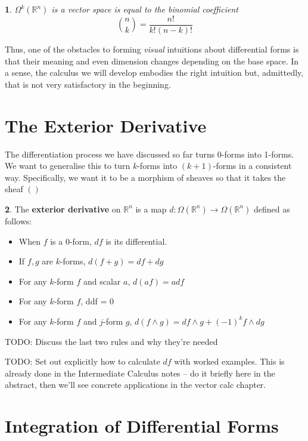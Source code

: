 \documentclass[oneside,english]{amsbook}
\numberwithin{section}{chapter}
\theoremstyle{plain}
\newtheorem{thm}{\protect\theoremname}
\theoremstyle{definition}
\newtheorem{defn}[thm]{\protect\definitionname}
\providecommand{\definitionname}{Definition}
\providecommand{\theoremname}{Theorem}
\begin{document}
			\begin{thm}
				$\Omega^k(\mathbb{R}^n)$ is a vector space is equal to the binomial coefficient 
				\[
					\binom{n}{k} = \frac{n!}{k!(n-k)!}
				\]
			\end{thm}
			
			Thus, one of the obstacles to forming \emph{visual} intuitions about differential forms is that their meaning and even dimension changes depending on the base space. In a sense, the calculus we will develop embodies the right intuition but, admittedly, that is not very satisfactory in the beginning. 

		\section{The Exterior Derivative}

			The differentiation process we have discussed so far turns 0-forms into 1-forms. We want to generalise this to turn $k$-forms into $(k+1)$-forms in a consistent way. Specifically, we want it to be a morphism of sheaves so that it takes the sheaf $()$
			
			\begin{defn}
				The \textbf{exterior derivative} on $\mathbb{R}^n$ is a map $d:\Omega(\mathbb{R}^n)\to \Omega(\mathbb{R}^n)$ defined as follows:
				\begin{itemize}
					\item When $f$ is a 0-form, $df$ is its differential.
					\item If $f, g$ are $k$-forms, $d(f + g) = df + dg$
					\item For any $k$-form $f$ and scalar $a$, $d(af) = adf$
					\item For any $k$-form $f$, ddf = 0
					\item For any $k$-form $f$ and $j$-form $g$, $d(f\wedge g) = df\wedge g + (-1)^kf\wedge dg$
				\end{itemize}
			\end{defn}
			
			TODO: Discuss the last two rules and why they're needed
			
			TODO: Set out explicitly how to calculate $df$ with worked examples. This is already done in the Intermediate Calculus notes -- do it briefly here in the abstract, then we'll see concrete applications in the vector calc chapter.
			
	
		\section{Integration of Differential Forms}
		
\end{document}
